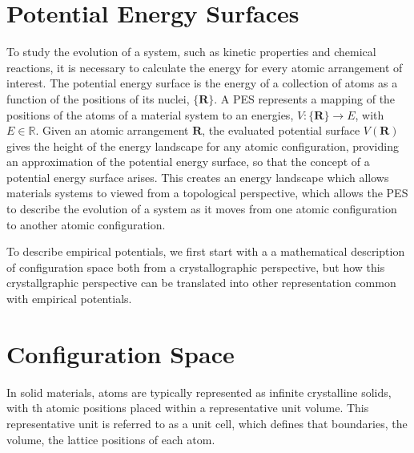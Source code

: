\section{Potential Energy Surfaces}

To study the evolution of a system, such as kinetic properties and chemical reactions, it is necessary to calculate the energy for every atomic arrangement of interest.  The potential energy surface is the energy of a collection of atoms as a function of the positions of its nuclei, $\{\bm{R}\}$.
A PES represents a mapping of the positions of the atoms of a material system to an energies, $V:\{\bm{R}\}\rightarrow E$, with $E\in\mathbb{R}$.
Given an atomic arrangement $\bm{R}$, the evaluated potential surface $V(\bm{R})$ gives the height of the energy landscape for any atomic configuration, providing an approximation of the potential energy surface, so that the concept of a potential energy surface arises.
This creates an energy landscape which allows materials systems to viewed from a topological perspective, which allows the PES to describe the evolution of a system as it moves from one atomic configuration to another atomic configuration.

To describe empirical potentials, we first start with a a mathematical description of configuration space both from a crystallographic perspective, but how this crystallgraphic perspective can be translated into other representation common with empirical potentials.

\section{Configuration Space}
In solid materials, atoms are typically represented as infinite crystalline solids, with th atomic positions placed within a representative unit volume.
This representative unit is referred to as a unit cell, which defines that boundaries, the volume, the lattice positions of each atom.

